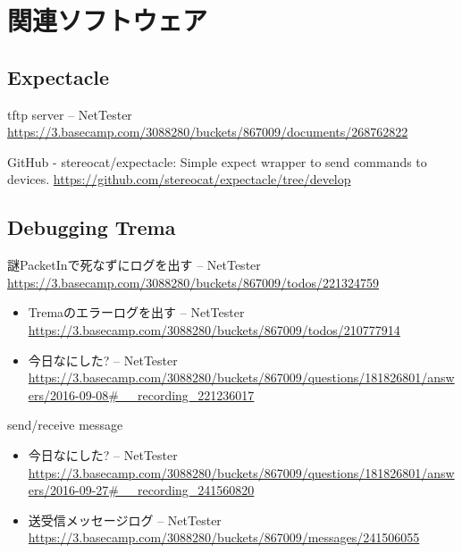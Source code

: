 
\chapter{関連ソフトウェア}

 \section{Expectacle}

tftp server – NetTester \url{https://3.basecamp.com/3088280/buckets/867009/documents/268762822}

GitHub - stereocat/expectacle: Simple expect wrapper to send commands to devices. \url{https://github.com/stereocat/expectacle/tree/develop}

\section{Debugging Trema}

謎PacketInで死なずにログを出す – NetTester \url{https://3.basecamp.com/3088280/buckets/867009/todos/221324759}

\begin{itemize}
 \item Tremaのエラーログを出す – NetTester \url{https://3.basecamp.com/3088280/buckets/867009/todos/210777914}
 \item 今日なにした? – NetTester \url{https://3.basecamp.com/3088280/buckets/867009/questions/181826801/answers/2016-09-08#__recording_221236017}
\end{itemize}

send/receive message

\begin{itemize}
 \item 今日なにした? – NetTester \url{https://3.basecamp.com/3088280/buckets/867009/questions/181826801/answers/2016-09-27#__recording_241560820}
 \item 送受信メッセージログ – NetTester \url{https://3.basecamp.com/3088280/buckets/867009/messages/241506055}
\end{itemize}

